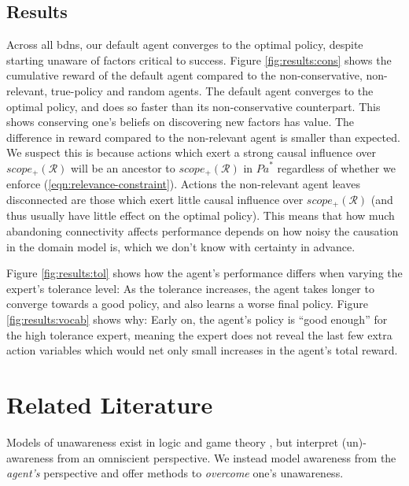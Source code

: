 \documentclass{article}
\newcommand{\bdn}{{\sc bdn}}
\newcommand{\Pa}{\mathit{Pa}}
\begin{document}
	\subsection{Results}
	
	Across all \bdn{}s, our default agent converges to the optimal policy, despite starting unaware of factors critical to success. Figure \ref{fig:results:cons} shows the cumulative reward of the default agent compared to the non-conservative, non-relevant, true-policy and random agents. The default agent converges to the optimal policy, and does so faster than its non-conservative counterpart. This shows conserving one's beliefs on discovering new factors has value. The difference in reward compared to the non-relevant agent is smaller than expected. We suspect this is because actions which exert a strong causal influence over $scope_+(\mathcal{R})$ will be an ancestor to $scope_+(\mathcal{R})$ in $\Pa^*$ regardless of whether we enforce (\ref{eqn:relevance-constraint}). Actions the non-relevant agent leaves disconnected are those which exert little causal influence over $scope_+(\mathcal{R})$ (and thus usually have little effect on the optimal policy). This means that how much abandoning connectivity affects performance depends on how noisy the causation in the domain model is, which we don't know with certainty in advance.
	
	Figure \ref{fig:results:tol} shows how the agent's performance differs when varying the expert's tolerance level: As the tolerance increases, the agent takes longer to converge towards a good policy, and also learns a worse final policy. Figure \ref{fig:results:vocab} shows why: Early on, the agent's policy is ``good enough'' for the high tolerance expert, meaning the expert does not reveal the last few extra action variables which would net only small increases in the agent's total reward.
	
	\section{Related Literature}
	
	Models of unawareness exist in logic \cite{board_two_2011,heifetz_dynamic_2013} and game theory \cite{feinberg_games_2012}, but interpret (un)-awareness from an omniscient perspective. We instead model awareness from the \emph{agent's} perspective and offer methods to \emph{overcome} one's unawareness.
	
\end{document}
